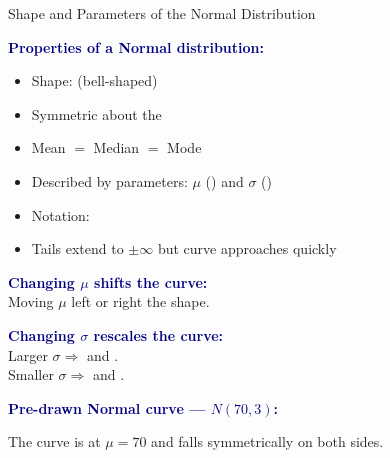 \documentclass[10pt]{article}
\begin{document}
\begin{notesbox}{Shape and Parameters of the Normal Distribution}
\small
\begin{multicols}{2}

\textbf{\textcolor{navy}{Properties of a Normal distribution:}}
\begin{itemize}[itemsep=3pt]
  \item Shape: \blank{3.5cm} (bell-shaped)
  \item Symmetric about the \blank{2cm}
  \item Mean $=$ Median $=$ Mode
  \item Described by \blank{1.5cm} parameters:
        $\mu$ (\blank{1.8cm}) and $\sigma$ (\blank{2.5cm})
  \item Notation: \blank{3cm}
  \item Tails extend to $\pm\infty$ but curve
        approaches \blank{2cm} quickly
\end{itemize}

\vspace{6pt}
\textbf{\textcolor{navy}{Changing $\mu$ shifts the curve:}}\\
Moving $\mu$ left or right \blank{3cm} the shape.

\vspace{4pt}
\textbf{\textcolor{navy}{Changing $\sigma$ rescales the curve:}}\\
Larger $\sigma \Rightarrow$ \blank{3cm} and \blank{2cm}.\\
Smaller $\sigma \Rightarrow$ \blank{3cm} and \blank{2cm}.

\columnbreak

\textbf{\textcolor{navy}{Pre-drawn Normal curve — $N(70, 3)$:}}

\vspace{4pt}
\begin{center}
\end{center}

\vspace{4pt}
\small The curve is \blank{3cm} at $\mu = 70$
and falls symmetrically on both sides.

\end{multicols}
\end{notesbox}
\end{document}
